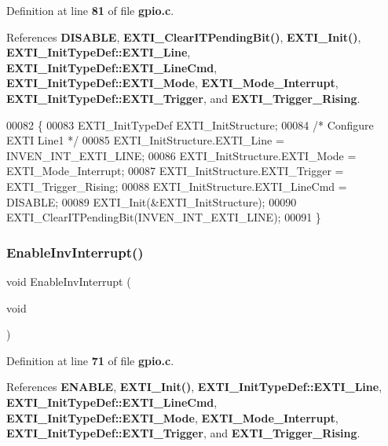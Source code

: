 Definition at line \textbf{ 81} of file \textbf{ gpio.\+c}.



References \textbf{ D\+I\+S\+A\+B\+LE}, \textbf{ E\+X\+T\+I\+\_\+\+Clear\+I\+T\+Pending\+Bit()}, \textbf{ E\+X\+T\+I\+\_\+\+Init()}, \textbf{ E\+X\+T\+I\+\_\+\+Init\+Type\+Def\+::\+E\+X\+T\+I\+\_\+\+Line}, \textbf{ E\+X\+T\+I\+\_\+\+Init\+Type\+Def\+::\+E\+X\+T\+I\+\_\+\+Line\+Cmd}, \textbf{ E\+X\+T\+I\+\_\+\+Init\+Type\+Def\+::\+E\+X\+T\+I\+\_\+\+Mode}, \textbf{ E\+X\+T\+I\+\_\+\+Mode\+\_\+\+Interrupt}, \textbf{ E\+X\+T\+I\+\_\+\+Init\+Type\+Def\+::\+E\+X\+T\+I\+\_\+\+Trigger}, and \textbf{ E\+X\+T\+I\+\_\+\+Trigger\+\_\+\+Rising}.


\begin{DoxyCode}
00082 \{
00083   EXTI_InitTypeDef   EXTI\_InitStructure;
00084     \textcolor{comment}{/* Configure EXTI Line1 */}
00085   EXTI\_InitStructure.EXTI_Line = INVEN_INT_EXTI_LINE;
00086   EXTI\_InitStructure.EXTI_Mode = EXTI_Mode_Interrupt;
00087   EXTI\_InitStructure.EXTI_Trigger = EXTI_Trigger_Rising;
00088   EXTI\_InitStructure.EXTI_LineCmd = DISABLE;
00089   EXTI_Init(&EXTI\_InitStructure);
00090   EXTI_ClearITPendingBit(INVEN_INT_EXTI_LINE);
00091 \}
\end{DoxyCode}
\mbox{\label{gpio_8c_ac956352ee6a2cc7b303eeec6bea6ee59}} 
\subsubsection{Enable\+Inv\+Interrupt()}
{\footnotesize\ttfamily void Enable\+Inv\+Interrupt (\begin{DoxyParamCaption}\item[{void}]{ }\end{DoxyParamCaption})}



Definition at line \textbf{ 71} of file \textbf{ gpio.\+c}.



References \textbf{ E\+N\+A\+B\+LE}, \textbf{ E\+X\+T\+I\+\_\+\+Init()}, \textbf{ E\+X\+T\+I\+\_\+\+Init\+Type\+Def\+::\+E\+X\+T\+I\+\_\+\+Line}, \textbf{ E\+X\+T\+I\+\_\+\+Init\+Type\+Def\+::\+E\+X\+T\+I\+\_\+\+Line\+Cmd}, \textbf{ E\+X\+T\+I\+\_\+\+Init\+Type\+Def\+::\+E\+X\+T\+I\+\_\+\+Mode}, \textbf{ E\+X\+T\+I\+\_\+\+Mode\+\_\+\+Interrupt}, \textbf{ E\+X\+T\+I\+\_\+\+Init\+Type\+Def\+::\+E\+X\+T\+I\+\_\+\+Trigger}, and \textbf{ E\+X\+T\+I\+\_\+\+Trigger\+\_\+\+Rising}.



